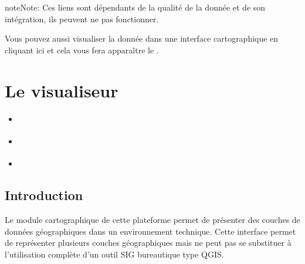 \documentclass[letterpaper,10pt,french]{sphinxmanual}
\let\sphinxpxdimen\pdfpxdimen\else\newdimen\sphinxpxdimen
\begin{document}
\begin{sphinxadmonition}{note}{Note:}
\sphinxAtStartPar
Ces liens sont dépendants de la qualité de la donnée et de son intégration, ils peuvent ne pas fonctionner.
\end{sphinxadmonition}

\sphinxAtStartPar
Vous pouvez aussi visualiser la donnée dans une interface cartographique en cliquant ici et cela vous fera apparaître le {\hyperref[\detokenize{doc_user/visualiseur:visualiseur}]{}}.

\noindent{\hspace*{\fill}\sphinxincludegraphics[width=600\sphinxpxdimen]{{fiche_carto}.png}\hspace*{\fill}}

\sphinxstepscope


\section{Le visualiseur}
\label{\detokenize{doc_user/visualiseur:le-visualiseur}}\label{\detokenize{doc_user/visualiseur::doc}}\label{\detokenize{doc_user/visualiseur:visualiseur}}
\begin{sphinxShadowBox}
\begin{itemize}
\item {} 
\sphinxAtStartPar
{}\label{\detokenize{doc_user/visualiseur:id1}}{\hyperref[\detokenize{doc_user/visualiseur:introduction}]{}}

\item {} 
\sphinxAtStartPar
{}\label{\detokenize{doc_user/visualiseur:id2}}{\hyperref[\detokenize{doc_user/visualiseur:la-gestion-des-couches}]{}}

\item {} 
\sphinxAtStartPar
{}\label{\detokenize{doc_user/visualiseur:id3}}{\hyperref[\detokenize{doc_user/visualiseur:les-fonctionnalites-techniques}]{}}

\end{itemize}
\end{sphinxShadowBox}


\subsection{Introduction}
\label{\detokenize{doc_user/visualiseur:introduction}}
\sphinxAtStartPar
Le module cartographique de cette plateforme permet de présenter des couches de données géographiques dans un environnement technique.
Cette interface permet de représenter plusieurs couches géographiques mais ne peut pas se substituer à l’utilisation complète d’un outil SIG bureautique type QGIS.
\end{document}
